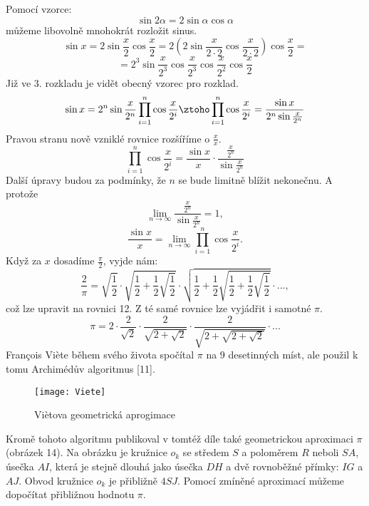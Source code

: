 \documentclass[soc]{gzwroc} %
\begin{document}
Pomocí vzorce:
$$
\sin 2\alpha = 2\sin \alpha \cos \alpha
$$
můžeme libovolně mnohokrát rozložit sinus.
$$
\sin x = 2\sin \frac{x}{2} \cos \frac{x}{2} = 2\left( 2\sin \frac{x}{2\cdot 2} \cos \frac{x}{2\cdot 2}\right) \cos \frac{x}{2} =
$$
\begin{equation*}
= 2^3 \sin \frac{x}{2^3} \cos \frac{x}{2^3} \cos \frac{x}{2^2} \cos \frac{x}{2}
\end{equation*}
Již ve 3. rozkladu je vidět obecný vzorec pro rozklad.
\begin{equation*}
\sin x =2^n \sin \frac{x}{2^n}\prod_{i=1}^{n} \cos \frac{x}{2^i} \ztoho \prod_{i=1}^{n} \cos \frac{x}{2^i} = \frac{\sin x}{2^n \sin \frac{x}{2^n}}
\end{equation*}
Pravou stranu nově vzniklé rovnice rozšíříme o $\frac{x}{x}$.
\begin{equation}
\prod_{i=1}^{n} \cos \frac{x}{2^i} = \frac{\sin x}{x} \cdot  \frac{\frac{x}{2^n}}{\sin \frac{x}{2^n}}
\end{equation}
Další úpravy budou za podmínky, že $n$ se bude limitně blížit nekonečnu. A protože
$$
\lim_{n\to\infty} \frac{\frac{x}{2^n}}{\sin \frac{x}{2^n}} = 1,
$$
\begin{equation}
\frac{\sin x}{x} = \lim_{n\to\infty} \prod_{i=1}^{n} \cos \frac{x}{2^i}.
\end{equation}
Když za $x$ dosadíme $\frac{\pi}{2}$, vyjde nám:
\begin{equation}
\frac{2}{\pi}=\sqrt{\frac{1}{2}}\cdot\sqrt{\frac{1}{2}+\frac{1}{2}\sqrt{\frac{1}{2}}}\cdot\sqrt{\frac{1}{2}+\frac{1}{2}\sqrt{\frac{1}{2}+\frac{1}{2}\sqrt{\frac{1}{2}}}}\cdot ...,
\end{equation}
což lze upravit na rovnici 12. Z té samé rovnice lze vyjádřit i samotné $\pi$.
$$
\pi=2\cdot\frac{2}{\sqrt{2}}\cdot\frac{2}{\sqrt{2+\sqrt{2}}}\cdot\frac{2}{\sqrt{2+\sqrt{2+\sqrt{2}}}}\cdot ...
$$
François Viète během svého života spočítal $\pi$ na 9 desetinných míst, ale použil k tomu Archimédův algoritmus [11].

\begin{figure}[!ht]
\texttt{[image: Viete]}
\caption{Viètova geometrická aprogimace}
\label{fig:kruh}
\end{figure}
Kromě tohoto algoritmu publikoval v tomtéž díle také geometrickou aproximaci $\pi$ (obrázek 14). Na obrázku je kružnice $o_k$ se středem $S$ a poloměrem $R$ neboli $SA$, úsečka $AI$, která je stejně dlouhá jako úsečka $DH$ a dvě rovnoběžné přímky: $IG$ a $AJ$. Obvod kružnice $o_k$ je přibližně $4SJ$. Pomocí zmíněné aproximací můžeme dopočítat přibližnou hodnotu $\pi$.
\end{document}
